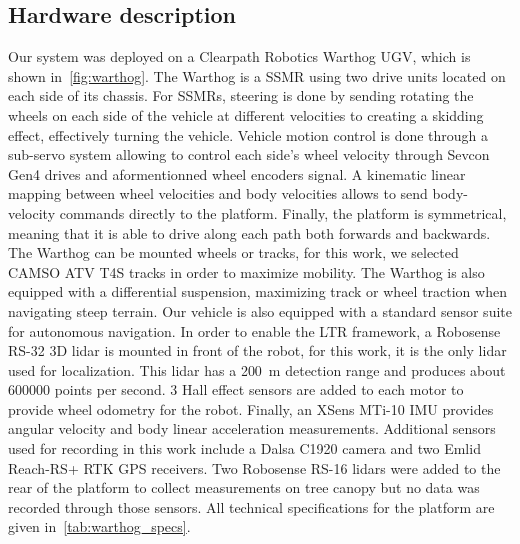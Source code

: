 \subsection{Hardware description}
\label{sec:hardware}

Our system was deployed on a Clearpath Robotics Warthog \ac{UGV}, which is shown in~\autoref{fig:warthog}. 
The Warthog is a \ac{SSMR} using two drive units located on each side of its chassis. 
For \acp{SSMR}, steering is done by sending rotating the wheels on each side of the vehicle at different velocities to creating a skidding effect, effectively turning the vehicle.
Vehicle motion control is done through a sub-servo system allowing to control each side's wheel velocity through Sevcon Gen4 drives and aformentionned wheel encoders signal.
A kinematic linear mapping between wheel velocities and body velocities allows to send body-velocity commands directly to the platform.
Finally, the platform is symmetrical, meaning that it is able to drive along each path both forwards and backwards.
The Warthog can be mounted wheels or tracks, for this work, we selected CAMSO ATV T4S tracks in order to maximize mobility. 
The Warthog is also equipped with a differential suspension, maximizing track or wheel traction when navigating steep terrain.
Our vehicle is also equipped with a standard sensor suite for autonomous navigation. 
In order to enable the \ac{LTR} framework, a Robosense RS-32 3D lidar is mounted in front of the robot, for this work, it is the only lidar used for localization.
This lidar has a \SI{200}{m} detection range and produces about \SI{600000}{} points per second.
3 Hall effect sensors are added to each motor to provide wheel odometry for the robot. 
Finally, an XSens MTi-10 \ac{IMU} provides angular velocity and body linear acceleration measurements. 
Additional sensors used for recording in this work include a Dalsa C1920 camera and two Emlid Reach-RS+ \ac {RTK} \ac{GPS} receivers.
Two Robosense RS-16 lidars were added to the rear of the platform to collect measurements on tree canopy but no data was recorded through those sensors. 
All technical specifications for the platform are given in~\autoref{tab:warthog_specs}.


